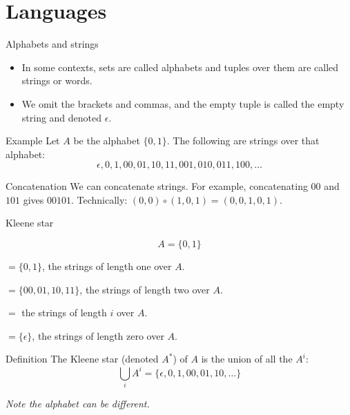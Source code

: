 \section{Languages}


\begin{frame}{Alphabets and strings}
  \begin{itemize}
    \item In some contexts, sets are called alphabets and tuples over them are called strings or words.
    \item We omit the brackets and commas, and the empty tuple is called the empty string and denoted $\epsilon$.
  \end{itemize}

  \begin{exampleblock}{Example}
    Let $A$ be the alphabet $\{0, 1\}$. The following are strings over that alphabet:
      $$ \epsilon, 0, 1, 00, 01, 10, 11, 001, 010, 011, 100, \ldots $$
  \end{exampleblock}

  \begin{exampleblock}{Concatenation}
    We can concatenate strings. For example, concatenating $00$ and $101$ gives $00101$. Technically: $(0,0) \circ (1,0,1) = (0,0,1,0,1)$.
  \end{exampleblock}
\end{frame}


\begin{frame}{Kleene star}
  \begin{topdisp}
    $$ A = \{0,1\} $$
  \end{topdisp}
  
  \begin{description}[abc]
    \item[$A^1$] $= \{0,1\}$, the strings of length one over $A$.
    \item[$A^2$] $= \{00,01,10,11\}$, the strings of length two over $A$.
    \item[$A^i$] $=$ the strings of length $i$ over $A$.
    \item[$A^0$] $= \{\epsilon\}$, the strings of length zero over $A$.
  \end{description}

  \begin{alertblock}{Definition}
    The Kleene star (denoted $A^*$) of $A$ is the union of all the $A^i$:
    $$\bigcup_i A^i = \{ \epsilon, 0, 1, 00, 01, 10, \ldots\}$$
  \end{alertblock}

  \emph{Note the alphabet can be different.}
\end{frame}


